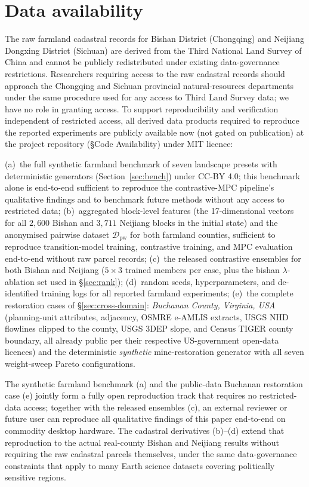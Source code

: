 \documentclass[11pt]{article}
\begin{document}
\section*{Data availability}
The raw farmland cadastral records for Bishan District (Chongqing) and Neijiang Dongxing District (Sichuan) are derived from the Third National Land Survey of China and cannot be publicly redistributed under existing data-governance restrictions. Researchers requiring access to the raw cadastral records should approach the Chongqing and Sichuan provincial natural-resources departments under the same procedure used for any access to Third Land Survey data; we have no role in granting access. To support reproducibility and verification independent of restricted access, all derived data products required to reproduce the reported experiments are publicly available now (not gated on publication) at the project repository (\S Code Availability) under MIT licence:

(a)~the full synthetic farmland benchmark of seven landscape presets with deterministic generators (Section~\ref{sec:bench}) under CC-BY 4.0; this benchmark alone is end-to-end sufficient to reproduce the contrastive-MPC pipeline's qualitative findings and to benchmark future methods without any access to restricted data;
(b)~aggregated block-level features (the 17-dimensional vectors for all $2{,}600$ Bishan and $3{,}711$ Neijiang blocks in the initial state) and the anonymised pairwise dataset $\mathcal{D}_{\text{pw}}$ for both farmland counties, sufficient to reproduce transition-model training, contrastive training, and MPC evaluation end-to-end without raw parcel records;
(c)~the released contrastive ensembles for both Bishan and Neijiang ($5 \times 3$ trained members per case, plus the bishan $\lambda$-ablation set used in \S\ref{sec:rank});
(d)~random seeds, hyperparameters, and de-identified training logs for all reported farmland experiments;
(e)~the complete restoration cases of \S\ref{sec:cross-domain}: \emph{Buchanan County, Virginia, USA} (planning-unit attributes, adjacency, OSMRE e-AMLIS extracts, USGS NHD flowlines clipped to the county, USGS 3DEP slope, and Census TIGER county boundary, all already public per their respective US-government open-data licences) and the deterministic \emph{synthetic} mine-restoration generator with all seven weight-sweep Pareto configurations.

The synthetic farmland benchmark (a) and the public-data Buchanan restoration case (e) jointly form a fully open reproduction track that requires no restricted-data access; together with the released ensembles (c), an external reviewer or future user can reproduce all qualitative findings of this paper end-to-end on commodity desktop hardware. The cadastral derivatives (b)--(d) extend that reproduction to the actual real-county Bishan and Neijiang results without requiring the raw cadastral parcels themselves, under the same data-governance constraints that apply to many Earth science datasets covering politically sensitive regions.
\end{document}
